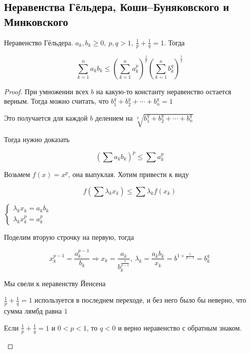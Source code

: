 \subsection{Неравенства Гёльдера, Коши–Буняковского и Минковского \href{https://youtu.be/p9C57KDo1Yg?t=1407}{\Walley}}

\begin{theorem-non}
    Неравенство Гёльдера. 
    $a_k, b_k \geqslant 0,\ p, q > 1,\ \frac{1}{p}+\frac{1}{q} = 1$. Тогда
    
    \[ \sum_{k=1}^{n} a_k b_k \leqslant \left( \sum_{k=1}^{n} a_k^p\right)^\frac{1}{p} \left( \sum_{k=1}^{n} b_k^q\right)^\frac{1}{q} \]
\end{theorem-non}

\begin{proof}
    При умножении всех $b$ на какую-то константу неравенство остается верным. Тогда можно считать, что $b_1^q+b_2^q+\cdots+b_n^q=1$

    Это получается для каждой $b$ делением на $\sqrt[q]{b_1^q+b_2^q+\cdots+b_n^q}$

    Тогда нужно доказать

    \[ \left(\sum a_k b_k \right)^p \leqslant \sum a_k^p \]

    Возьмем $f(x) = x^p$, она выпуклая. Хотим привести к виду

    \[ f(\sum \lambda_k x_k) \leqslant \sum \lambda_k f(x_k) \]

    $
    \begin{cases}
        \lambda_k x_k = a_k b_k \\
        \lambda_k x_k^p = a_k^p
    \end{cases}
    $

    Поделим вторую строчку на первую, тогда

    \[ x_k^{p-1} = \frac{a_k^{p-1}}{b_k} \Rightarrow x_k = \frac{a_k}{b_k^{\frac{1}{p-1}}},\ 
    \lambda_k = \frac{a_k b_k}{x_k} = b^{1+\frac{1}{p-1}} = b_k^q\]

    Мы свели к неравенству Йенсена

    $\frac{1}{p}+\frac{1}{q} = 1$ используется в последнем переходе, и без него было бы неверно, что сумма лямбд равна $1$

    \begin{notice}
        Если $\frac{1}{p}+\frac{1}{q} = 1$ и $0 < p < 1$, то $q < 0$ и верно неравенство с обратным знаком.
    \end{notice}
\end{proof}

